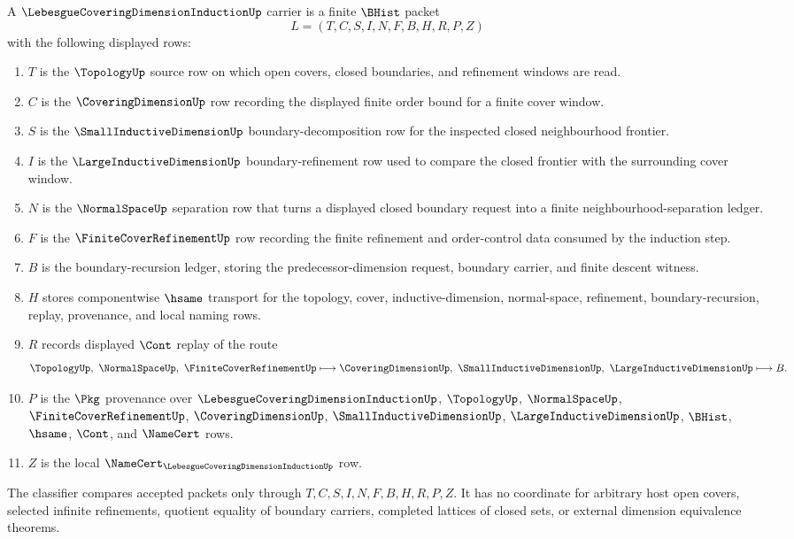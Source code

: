 \begin{definition}
\label{def:lebesgue-covering-dimension-induction-carrier}
A $\LebesgueCoveringDimensionInductionUp$ carrier is a finite $\BHist$ packet
$$
L=(T,C,S,I,N,F,B,H,R,P,Z)
$$
with the following displayed rows:
\begin{enumerate}
\item $T$ is the $\TopologyUp$ source row on which open covers, closed boundaries, and refinement windows are read.
\item $C$ is the $\CoveringDimensionUp$ row recording the displayed finite order bound for a finite cover window.
\item $S$ is the $\SmallInductiveDimensionUp$ boundary-decomposition row for the inspected closed neighbourhood frontier.
\item $I$ is the $\LargeInductiveDimensionUp$ boundary-refinement row used to compare the closed frontier with the surrounding cover window.
\item $N$ is the $\NormalSpaceUp$ separation row that turns a displayed closed boundary request into a finite neighbourhood-separation ledger.
\item $F$ is the $\FiniteCoverRefinementUp$ row recording the finite refinement and order-control data consumed by the induction step.
\item $B$ is the boundary-recursion ledger, storing the predecessor-dimension request, boundary carrier, and finite descent witness.
\item $H$ stores componentwise $\hsame$ transport for the topology, cover, inductive-dimension, normal-space, refinement, boundary-recursion, replay, provenance, and local naming rows.
\item $R$ records displayed $\Cont$ replay of the route
$$
\TopologyUp,\ \NormalSpaceUp,\ \FiniteCoverRefinementUp
\longmapsto
\CoveringDimensionUp,\ \SmallInductiveDimensionUp,\ \LargeInductiveDimensionUp
\longmapsto B .
$$
\item $P$ is the $\Pkg$ provenance over $\LebesgueCoveringDimensionInductionUp$, $\TopologyUp$, $\NormalSpaceUp$, $\FiniteCoverRefinementUp$, $\CoveringDimensionUp$, $\SmallInductiveDimensionUp$, $\LargeInductiveDimensionUp$, $\BHist$, $\hsame$, $\Cont$, and $\NameCert$ rows.
\item $Z$ is the local $\NameCert_{\LebesgueCoveringDimensionInductionUp}$ row.
\end{enumerate}
The classifier compares accepted packets only through $T,C,S,I,N,F,B,H,R,P,Z$. It has no coordinate for arbitrary host open covers, selected infinite refinements, quotient equality of boundary carriers, completed lattices of closed sets, or external dimension equivalence theorems.
\end{definition}

